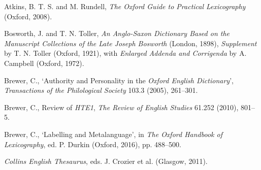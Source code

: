 \begin{list}{}%
{\leftmargin=0.5in \itemindent=-0.5in}
\setlength{\itemsep}{0pt}
\setlength{\parskip}{0pt}
\setlength{\parsep}{0pt}





\item %
Atkins, B. T. S. and M. Rundell, \textit{The Oxford Guide to Practical Lexicography} (Oxford, 2008).

\item
Bosworth, J. and T. N. Toller, \textit{An Anglo-Saxon Dictionary Based on the Manuscript Collections of the Late Joseph Bosworth} (London, 1898), \textit{Supplement} by T. N. Toller (Oxford, 1921), with \textit{Enlarged Addenda and Corrigenda} by A. Campbell (Oxford, 1972).


\item %
Brewer, C., `Authority and Personality in the \textit{Oxford English Dictionary}', \textit{Transactions of the Philological Society} 103.3 (2005), 261–301.


\item %
Brewer, C., Review of \textit{HTE1}, \textit{The Review of English Studies} 61.252 (2010), 801–5.

\item %
Brewer, C., `Labelling and Metalanguage', in \textit{The Oxford Handbook of Lexicography}, ed. P. Durkin (Oxford, 2016), pp. 488–500.

\item %
\textit{Collins English Thesaurus}, eds. J. Crozier et al. (Glasgow, 2011).


\end{list}
